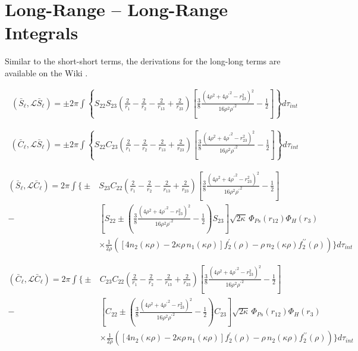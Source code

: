 \documentclass[Dissertation.tex]{subfiles}
\begin{document}
\section{Long-Range -- Long-Range Integrals}
\label{sec:DWaveLongLong}

Similar to the short-short terms, the derivations for the long-long terms are 
available on the Wiki \cite{Wiki}.

\begin{align}
\label{eq:DWaveSBarSBar}
\left(\bar{S}_\ell,\mathcal{L}\bar{S}_\ell\right) = \pm 2\pi \int \left\{ S_{22} S_{23} \left(\frac{2}{r_1} - \frac{2}{r_2} - \frac{2}{r_{13}} + \frac{2}{r_{23}} \right) \left[ \frac{3}{8} \frac{(4\rho^2 + 4 {\rho^\prime}^2 - r_{23}^2)^2}{16 \rho^2 {\rho^\prime}^2} - \frac{1}{2} \right] \right\} d\tau_{int}
\end{align}

\begin{align}
\label{eq:DWaveCBarSBar}
\left(\bar{C}_\ell,\mathcal{L}\bar{S}_\ell\right) = \pm 2\pi \int \left\{ S_{22} C_{23} \left(\frac{2}{r_1} - \frac{2}{r_2} - \frac{2}{r_{13}} + \frac{2}{r_{23}} \right) \left[ \frac{3}{8} \frac{(4\rho^2 + 4 {\rho^\prime}^2 - r_{23}^2)^2}{16 \rho^2 {\rho^\prime}^2} - \frac{1}{2} \right] \right\} d\tau_{int}
\end{align}

\begin{align}
\label{eq:DWaveSBarCBar}
\nonumber \left(\bar{S}_\ell,\mathcal{L}\bar{C}_\ell\right) = 2\pi \int \Bigg\{ \pm & S_{23} C_{22} \left(\frac{2}{r_1} - \frac{2}{r_2} - \frac{2}{r_{13}} + \frac{2}{r_{23}} \right) \left[ \frac{3}{8} \frac{(4\rho^2 + 4 {\rho^\prime}^2 - r_{23}^2)^2}{16 \rho^2 {\rho^\prime}^2} - \frac{1}{2} \right] \\
\nonumber - & \left[ S_{22} \pm \left( \frac{3}{8} \frac{(4\rho^2 + 4 {\rho^\prime}^2 - r_{23}^2)^2}{16 \rho^2 {\rho^\prime}^2} - \frac{1}{2} \right) S_{23} \right] \sqrt{2\kappa} \, \Phi_{Ps}\left(r_{12}\right) \Phi_H\left(r_3\right) \\
& \times \frac{1}{2\rho} \left( \left[ 4 n_2(\kappa\rho) - 2 \kappa\rho \, n_1(\kappa\rho) \right] f_2^\prime(\rho) - \rho \, n_2(\kappa\rho) f_2^{\prime\prime}(\rho) \right) \Bigg\} d\tau_{int}
\end{align}

\begin{align}
\label{eq:DWaveCBarCBar}
\nonumber \left(\bar{C}_\ell,\mathcal{L}\bar{C}_\ell\right) = 2\pi \int \Bigg\{ \pm & C_{23} C_{22} \left(\frac{2}{r_1} - \frac{2}{r_2} - \frac{2}{r_{13}} + \frac{2}{r_{23}} \right) \left[ \frac{3}{8} \frac{(4\rho^2 + 4 {\rho^\prime}^2 - r_{23}^2)^2}{16 \rho^2 {\rho^\prime}^2} - \frac{1}{2} \right] \\
\nonumber - & \left[ C_{22} \pm \left( \frac{3}{8} \frac{(4\rho^2 + 4 {\rho^\prime}^2 - r_{23}^2)^2}{16 \rho^2 {\rho^\prime}^2} - \frac{1}{2} \right) C_{23} \right] \sqrt{2\kappa} \, \Phi_{Ps}\left(r_{12}\right) \Phi_H\left(r_3\right) \\
& \times \frac{1}{2\rho} \left( \left[ 4 n_2(\kappa\rho) - 2 \kappa\rho \, n_1(\kappa\rho) \right] f_2^\prime(\rho) - \rho \, n_2(\kappa\rho) f_2^{\prime\prime}(\rho) \right) \Bigg\} d\tau_{int}
\end{align}
\end{document}
